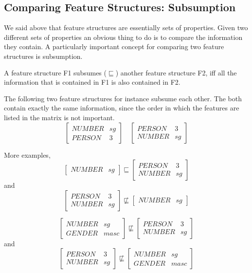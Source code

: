 \documentclass{article}
\begin{document}
\begin{CJK}{UTF8}{gbsn}
\subsection{Comparing Feature Structures: Subsumption}

We said above that feature structures are essentially sets of properties. Given two different sets of properties an obvious thing to do is to compare the information they contain. A particularly important concept for comparing two feature structures is subsumption.

A feature structure F1  subsumes ($\sqsubseteq$) another feature structure F2, iff all the information that is contained in F1  is also contained in F2.

The following two feature structures for instance subsume each other. 
The both contain exactly the same information, since the order in which the features are listed in the matrix is not important.
\[
\begin{bmatrix}
NUMBER & sg \\
PERSON & 3
\end{bmatrix} \quad 
\begin{bmatrix}
PERSON & 3 \\
NUMBER & sg
\end{bmatrix}
\]

More examples,
\[
\begin{bmatrix}
NUMBER & sg
\end{bmatrix}
\sqsubseteq
\begin{bmatrix}
PERSON & 3 \\
NUMBER & sg
\end{bmatrix}
\]
and
\[
\begin{bmatrix}
PERSON & 3 \\
NUMBER & sg
\end{bmatrix}
\not\sqsubseteq
\begin{bmatrix}
NUMBER & sg
\end{bmatrix}
\]

\[
\begin{bmatrix}
NUMBER & sg \\
GENDER & masc 
\end{bmatrix}
\not\sqsubseteq
\begin{bmatrix}
PERSON & 3 \\
NUMBER & sg
\end{bmatrix}
\]
and
\[
\begin{bmatrix}
PERSON & 3 \\
NUMBER & sg
\end{bmatrix}
\not\sqsubseteq
\begin{bmatrix}
NUMBER & sg \\
GENDER & masc 
\end{bmatrix}
\]


\end{CJK}
\end{document}
